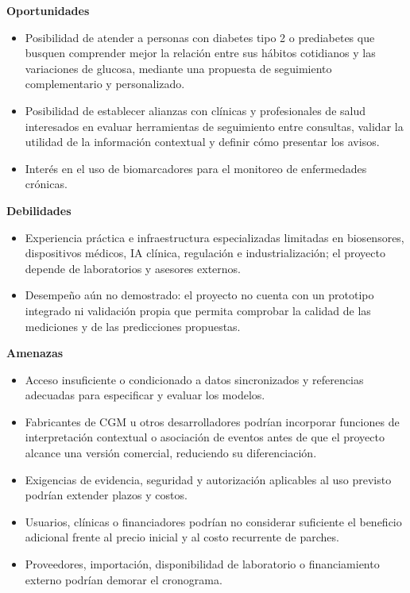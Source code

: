 \noindent\textbf{Oportunidades}
\begin{itemize}
    \item Posibilidad de atender a personas con diabetes tipo 2 o prediabetes que busquen comprender mejor la relación entre sus hábitos cotidianos y las variaciones de glucosa, mediante una propuesta de seguimiento complementario y personalizado.
    \item Posibilidad de establecer alianzas con clínicas y profesionales de salud interesados en evaluar herramientas de seguimiento entre consultas, validar la utilidad de la información contextual y definir cómo presentar los avisos.
    \item Interés en el uso de biomarcadores para el monitoreo de enfermedades crónicas.
\end{itemize}

\noindent\textbf{Debilidades}
\begin{itemize}
    \item Experiencia práctica e infraestructura especializadas limitadas en biosensores, dispositivos médicos, IA clínica, regulación e industrialización; el proyecto depende de laboratorios y asesores externos.
    \item Desempeño aún no demostrado: el proyecto no cuenta con un prototipo integrado ni validación propia que permita comprobar la calidad de las mediciones y de las predicciones propuestas.
\end{itemize}

\noindent\textbf{Amenazas}
\begin{itemize}
    \item Acceso insuficiente o condicionado a datos sincronizados y referencias adecuadas para especificar y evaluar los modelos.
    \item Fabricantes de CGM u otros desarrolladores podrían incorporar funciones de interpretación contextual o asociación de eventos antes de que el proyecto alcance una versión comercial, reduciendo su diferenciación.
    \item Exigencias de evidencia, seguridad y autorización aplicables al uso previsto podrían extender plazos y costos.
    \item Usuarios, clínicas o financiadores podrían no considerar suficiente el beneficio adicional frente al precio inicial y al costo recurrente de parches.
    \item Proveedores, importación, disponibilidad de laboratorio o financiamiento externo podrían demorar el cronograma.
\end{itemize}





